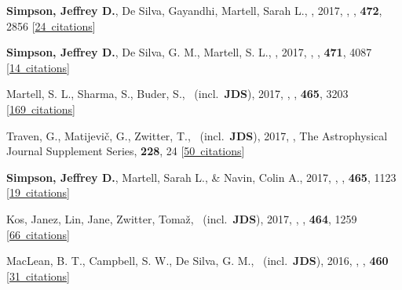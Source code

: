 \item[{\color{numcolor}\scriptsize12}] \textbf{Simpson, Jeffrey D.}, De Silva, Gayandhi, Martell, Sarah L., \etal, 2017, , \mnras, \textbf{472}, 2856 [\href{https://ui.adsabs.harvard.edu/#abs/2017MNRAS.472.2856S}{24~citations}]

\item[{\color{numcolor}\scriptsize11}] \textbf{Simpson, Jeffrey D.}, De Silva, G. M., Martell, S. L., \etal, 2017, , \mnras, \textbf{471}, 4087 [\href{https://ui.adsabs.harvard.edu/#abs/2017MNRAS.471.4087S}{14~citations}]

\item[{\color{numcolor}\scriptsize10}] Martell, S. L., Sharma, S., Buder, S., \etal\ (incl.\ \textbf{JDS}), 2017, , \mnras, \textbf{465}, 3203 [\href{https://ui.adsabs.harvard.edu/#abs/2017MNRAS.465.3203M}{169~citations}]

\item[{\color{numcolor}\scriptsize9}] Traven, G., Matijevi{\v{c}}, G., Zwitter, T., \etal\ (incl.\ \textbf{JDS}), 2017, , The Astrophysical Journal Supplement Series, \textbf{228}, 24 [\href{https://ui.adsabs.harvard.edu/#abs/2017ApJS..228...24T}{50~citations}]

\item[{\color{numcolor}\scriptsize8}] \textbf{Simpson, Jeffrey D.}, Martell, Sarah L., \& Navin, Colin A., 2017, , \mnras, \textbf{465}, 1123 [\href{https://ui.adsabs.harvard.edu/#abs/2017MNRAS.465.1123S}{19~citations}]

\item[{\color{numcolor}\scriptsize7}] Kos, Janez, Lin, Jane, Zwitter, Toma{\v{z}}, \etal\ (incl.\ \textbf{JDS}), 2017, , \mnras, \textbf{464}, 1259 [\href{https://ui.adsabs.harvard.edu/#abs/2017MNRAS.464.1259K}{66~citations}]

\item[{\color{numcolor}\scriptsize6}] MacLean, B. T., Campbell, S. W., De Silva, G. M., \etal\ (incl.\ \textbf{JDS}), 2016, , \mnras, \textbf{460} [\href{https://ui.adsabs.harvard.edu/#abs/2016MNRAS.460L..69M}{31~citations}]

